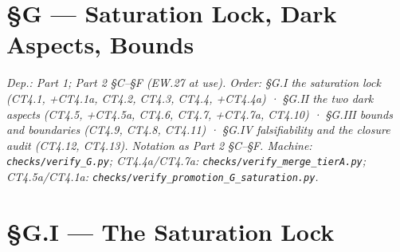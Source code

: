 \section[§G — Saturation Lock, Dark Aspects, Bounds]{\texorpdfstring{§G — Saturation Lock, Dark Aspects, Bounds}{SG - Saturation Lock, Dark Aspects, Bounds}}

\textit{Dep.: Part 1; Part 2 §C–§F (EW.27 at use). Order: §G.I the saturation lock (CT4.1, +CT4.1a, CT4.2, CT4.3, CT4.4, +CT4.4a) · §G.II the two dark aspects (CT4.5, +CT4.5a, CT4.6, CT4.7, +CT4.7a, CT4.10) · §G.III bounds and boundaries (CT4.9, CT4.8, CT4.11) · §G.IV falsifiability and the closure audit (CT4.12, CT4.13). Notation as Part 2 §C–§F. Machine: \texttt{checks/\allowbreak{}verify\_\allowbreak{}G.py}; CT4.4a/CT4.7a: \texttt{checks/\allowbreak{}verify\_\allowbreak{}merge\_\allowbreak{}tierA.py}; CT4.5a/CT4.1a: \texttt{checks/\allowbreak{}verify\_\allowbreak{}promotion\_\allowbreak{}G\_\allowbreak{}saturation.py}.}

\section[§G.I — The Saturation Lock]{\texorpdfstring{§G.I — The Saturation Lock}{SG.I - The Saturation Lock}}

